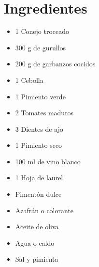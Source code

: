 
    \begin{minipage}[t]{0.35\textwidth}
        \small
        \section*{Ingredientes}
        \begin{itemize}[leftmargin=*, itemsep=1pt]
            \item 1 Conejo troceado
            \item 300 g de gurullos
            \item 200 g de garbanzos cocidos
            \item 1 Cebolla
            \item 1 Pimiento verde
            \item 2 Tomates maduros
            \item 3 Dientes de ajo
            \item 1 Pimiento seco
            \item 100 ml de vino blanco
            \item 1 Hoja de laurel
            \item Pimentón dulce
            \item Azafrán o colorante
            \item Aceite de oliva
            \item Agua o caldo
            \item Sal y pimienta
        \end{itemize}
    \end{minipage}
    \hfill
